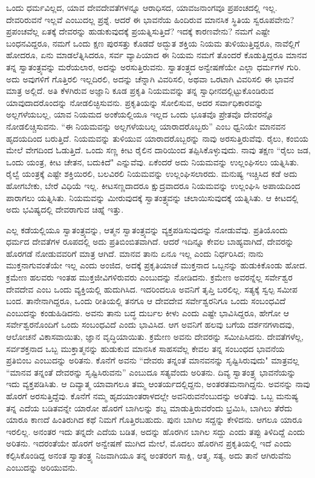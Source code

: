 ಒಂದು ಧರ್ಮವಿಲ್ಲದ, ಯಾವ ದೇವದೇವತೆಗಳನ್ನೂ ಆರಾಧಿಸದ, ಯಾವ\break ಜನಾಂಗವೂ ಪ್ರಪಂಚದಲ್ಲಿ ಇಲ್ಲ. ದೇವರಿರುವನೆ ಇಲ್ಲವೆ ಎಂಬುದಲ್ಲ ಪ್ರಶ್ನೆ. ಆದರೆ ಈ ಭಾವನೆಯ ಹಿಂದಿರುವ ಮಾನಸಿಕ ಸ್ಥಿತಿಯ ಸ್ವರೂಪವೇನು? ಪ್ರಪಂಚವೆಲ್ಲ ಏತಕ್ಕೆ ದೇವರನ್ನು ಹುಡುಕುವುದಕ್ಕೆ ಪ್ರಯತ್ನಿಸುತ್ತಿದೆ? ಇದಕ್ಕೆ ಕಾರಣವೇನು? ನಮಗೆ ಎಷ್ಟೇ ಬಂಧನವಿದ್ದರೂ, ನಮಗೆ ಒಂದು ಕ್ಷಣ ಪುರಸತ್ತು ಕೊಡದೆ ಅದ್ಭುತ ಶಕ್ತಿಯ ನಿಯಮ ತುಳಿಯುತ್ತಿದ್ದರೂ, ನಾವೆಲ್ಲಿಗೆ ಹೋದರೂ, ಏನು ಮಾಡಲೆತ್ನಿಸಿದರೂ, ಸರ್ವ ವ್ಯಾಪಿಯಾದ ಈ ನಿಯಮ ನಮಗೆ ತೊಂದರೆ ಕೊಡುತ್ತಿದ್ದರೂ ಮಾನವ ತನ್ನ ಸ್ವಾತಂತ್ರ್ಯವನ್ನು ಮರೆಯಲಾರ, ಅದನ್ನು ಅರಸುತ್ತಿರುವನು. ಸ್ವಾತಂತ್ರ್ಯದ ಅನ್ವೇಷಣೆಯೇ ಎಲ್ಲಾ ಧರ್ಮಗಳ ಗುರಿ. ಅದು ಅವುಗಳಿಗೆ ಗೊತ್ತಿರಲಿ ಇಲ್ಲದಿರಲಿ, ಅದನ್ನು ಚೆನ್ನಾಗಿ ವಿವರಿಸಲಿ, ಅಥವಾ ಒರಟಾಗಿ ವಿವರಿಸಲಿ ಈ ಭಾವನೆ ಮಾತ್ರ ಅಲ್ಲಿದೆ. ಅತಿ ಕೆಳಗಿರುವ ಅಜ್ಞಾನಿ ಕೂಡ ಪ್ರಕೃತಿ ನಿಯಮವನ್ನು ತನ್ನ ಸ್ವಾಧೀನದಲ್ಲಿಟ್ಟುಕೊಂಡಿರುವ ಯಾವುದಾದರೊಂದನ್ನು ನೋಡಲಿಚ್ಛಿಸುವನು. ಪ್ರಕೃತಿಯನ್ನು ಸೋಲಿಸುವ, ಅದರ ಸರ್ವಾಧಿಕಾರವನ್ನು ಅಲ್ಲಗಳೆಯಬಲ್ಲ, ಯಾವ ನಿಯಮದ ಅಂಕೆಯಲ್ಲಿಯೂ ಇಲ್ಲದ ಒಂದು ಭೂತವೊ ಪ್ರೇತವೊ ದೇವರನ್ನೊ ನೋಡಲಿಚ್ಚಿಸುವನು. “ಈ ನಿಯಮವನ್ನು ಅಲ್ಲಗಳೆಯಬಲ್ಲ ಯಾರಾದರೊಬ್ಬರು” ಎಂಬ ಧ್ವನಿಯೇ ಮಾನವನ ಹೃದಯದಿಂದ ಬರುತ್ತಿದೆ. ನಿಯಮವನ್ನು ತುಳಿಯುವ ಯಾರಾದರೊಬ್ಬರನ್ನು ನಾವು ಅರಸುತ್ತಿರುವೆವು. ರೈಲು, ಕಂಬಿಯ ಮೇಲೆ ವೇಗದಿಂದ ಓಡುತ್ತಿದೆ. ಒಂದು ಸಣ್ಣ ಕೀಟ ರೈಲಿನ ದಾರಿಯಿಂದ ತಪ್ಪಿಸಿಕೊಳ್ಳುವುದು. ನಾವು ತಕ್ಷಣ “ರೈಲು ಜಡ, ಒಂದು ಯಂತ್ರ, ಕೀಟ ಚೇತನ, ಬದುಕಿದೆ" ಎನ್ನುವೆವು. ಏಕೆಂದರೆ ಅದು ನಿಯಮವನ್ನು ಉಲ್ಲಂಘಿಸಲು ಯತ್ನಿಸಿತು. ರೈಲ್ವೆ ಯಂತ್ರಕ್ಕೆ ಎಷ್ಟೇ ಶಕ್ತಿಯಿರಲಿ, ಬಲವಿರಲಿ ನಿಯಮವನ್ನು ಉಲ್ಲಂಘಿಸಲಾರದು. ಮನುಷ್ಯ ಇಚ್ಚಿಸಿದ ಕಡೆ ಅದು ಹೋಗಬೇಕು, ಬೇರೆ ವಿಧಿಯೆ ಇಲ್ಲ. ಕೀಟಸಣ್ಣದಾದರೂ ಕ್ಷುದ್ರವಾದರೂ ನಿಯಮವನ್ನು ಉಲ್ಲಂಘಿಸಿ ಅಪಾಯದಿಂದ ಪಾರಾಗಲು ಯತ್ನಿಸಿತು. ನಿಯಮವನ್ನು ಮೀರುವುದಕ್ಕೆ ಸ್ವಾತಂತ್ರ್ಯವನ್ನು ಚಲಾಯಿಸುವುದಕ್ಕೆ ಯತ್ನಿಸಿತು. ಆ ಕೀಟದಲ್ಲಿ ಅದು ಭವಿಷ್ಯದಲ್ಲಿ ದೇವರಾಗುವ ಚಿಹ್ನೆ ಇತ್ತು.

ಎಲ್ಲ ಕಡೆಯಲ್ಲಿಯೂ ಸ್ವಾತಂತ್ರ್ಯವನ್ನು, ಆತ್ಮನ ಸ್ವಾತಂತ್ರ್ಯವನ್ನು ವ್ಯಕ್ತಪಡಿಸುವುದನ್ನು ನೋಡುವೆವು. ಪ್ರತಿಯೊಂದು ಧರ್ಮದ ದೇವತೆಗಳ ರೂಪದಲ್ಲಿ ಅದು ಪ್ರತಿಬಿಂಬಿತವಾಗಿದೆ. ಆದರೆ ಇದಿನ್ನೂ ಕೇವಲ ಬಾಹ್ಯವಾಗಿದೆ, ದೇವರನ್ನು ಹೊರಗಡೆ ನೋಡುವವರಿಗೆ ಮಾತ್ರ ಆಗಿದೆ. ಮಾನವ ತಾನು ಏನೂ ಇಲ್ಲ ಎಂದು ನಿರ್ಧರಿಸಿದ; ನಾನು ಮುಕ್ತನಾಗುವಂತೆಯೇ ಇಲ್ಲ ಎಂದು ಅಂಜಿದ, ಅದಕ್ಕೆ ಪ್ರಕೃತಿಯಾಚೆ ಮುಕ್ತನಾದ ಒಬ್ಬನನ್ನು ಹುಡುಕಿಕೊಂಡು ಹೋದ. ಕ್ರಮೇಣ ಹಲವರು ಇಂತಹ ಮುಕ್ತಜೀವಿಗಳಿರುವರು ಎಂಬುದನ್ನು ನೋಡಿದನು. ಕ್ರಮೇಣ ಅವರನ್ನೆಲ್ಲ ಸರ್ವೇಶ್ವರ ದೇವದೇವ ಎಂಬ ಒಂದು ವ್ಯಕ್ತಿಯಲ್ಲಿ ಹುದುಗಿಸಿದ. ಇದರಿಂದಲೂ ಅವನಿಗೆ ತೃಪ್ತಿ ಬರಲಿಲ್ಲ. ಸತ್ಯಕ್ಕೆ ಸ್ವಲ್ಪ ಸಮೀಪ ಬಂದ. ತಾನೇನಾಗಿದ್ದರೂ, ಒಂದು ರೀತಿಯಲ್ಲಿ ತನಗೂ ಆ ದೇವದೇವ ಸರ್ವೇಶ್ವರನಿಗೂ ಒಂದು ಸಂಬಂಧವಿದೆ ಎಂಬುದನ್ನು ಕಂಡುಹಿಡಿದನು. ಅವನು ತಾನು ಬದ್ಧ ದುರ್ಬಲ ಕೀಳು ಎಂದು ಎಷ್ಟೇ ಭಾವಿಸಿದ್ದರೂ, ಹೇಗೋ ಆ ಸರ್ವೇಶ್ವರನೊಂದಿಗೆ ಒಂದು ಸಂಬಂಧವಿದೆ ಎಂದು ಭಾವಿಸಿದ. ಆಗ ಅವನಿಗೆ ಹಲವು ಬಗೆಯ ದರ್ಶನಗಳಾದವು, ಆಲೋಚನೆ ವಿಕಾಸವಾಯಿತು, ಜ್ಞಾನ ವೃದ್ಧಿಯಾಯಿತು. ಕ್ರಮೇಣ ಅವನು ದೇವರನ್ನು ಸಮೀಪಿಸಿದನು. ದೇವತೆಗಳೆಲ್ಲ, ಸರ್ವಶಕ್ತನಾದ ಒಬ್ಬ ಮುಕ್ತಾತ್ಮನನ್ನು ಹುಡುಕುವ ಮಾನಸಿಕ ಸಾಹಸವೆಲ್ಲ ಕೇವಲ ತನ್ನ ಸಂಬಂಧದ ಭಾವನೆಯ ಪ್ರತಿಬಿಂಬ ಎಂಬುದನ್ನು ಅರಿತನು. ಕೊನೆಗೆ ಅವನು “ದೇವರು ತನ್ನಂತೆ ಮಾನವನನ್ನು ಸೃಷ್ಟಿಸಿರುವುದು" ಮಾತ್ರವಲ್ಲ “ಮಾನವ ತನ್ನಂತೆ ದೇವರನ್ನು ಸೃಷ್ಟಿಸಿರುವನು” ಎಂಬುದೂ ಸತ್ಯವೆಂದು ಅರಿತನು. ದಿವ್ಯ ಸ್ವಾತಂತ್ರ್ಯ ಭಾವನೆಯನ್ನು ಇದು ವ್ಯಕ್ತಪಡಿಸಿತು. ಆ ದಿವ್ಯಾತ್ಮ ಯಾವಾಗಲೂ ತಮ್ಮ ಆಂತರ್ಯದಲ್ಲಿದ್ದನು, ಅಂತರತಮನಾಗಿದ್ದನು. ಅವನನ್ನು ನಾವು ಹೊರಗೆ ಅರಸುತ್ತಿದ್ದೆವು. ಕೊನೆಗೆ ನಮ್ಮ ಹೃದಯಾಂತರಾಳದಲ್ಲೇ ಅವನಿರುವನೆಂಬುದನ್ನು ಅರಿತೆವು. ಒಬ್ಬ ಮನುಷ್ಯ ತನ್ನ ಎದೆಯ ಬಡಿತವನ್ನೇ ಯಾರೋ ಹೊರಗೆ ಬಾಗಿಲನ್ನು ಶಬ್ದ ಮಾಡುತ್ತಿರುವರೆಂದು ಭ್ರಮಿಸಿ, ಬಾಗಿಲು ತೆರೆದು ಯಾರೂ ಕಾಣದೆ ಹಿಂತಿರುಗಿದ ಕಥೆ ನಿಮಗೆ ಗೊತ್ತಿರಬಹುದು. ಪುನಃ ಬಾಗಿಲ ಸದ್ದನ್ನು ಕೇಳಿದನು. ಆಗಲೂ ಯಾರೂ ಇರಲಿಲ್ಲ. ಅನಂತರ ಇದು ತನ್ನದೇ ಎದೆಯ ಬಡಿತ, ಅದನ್ನು ಹೊರಗಿನ ಬಾಗಿಲ ಸದ್ದು ಎಂದು ತಪ್ಪು ತಿಳಿದಿದ್ದೆ ಎಂದು ಅರಿತನು. ಇದರಂತೆಯೇ ಹೊರಗೆ ಅನ್ವೇಷಣೆ ಮುಗಿದ ಮೇಲೆ, ಮೊದಲು ಹೊರಗಿನ ಪ್ರಕೃತಿಯಲ್ಲಿ ಇದೆ ಎಂದು ಕಲ್ಪಿಸಿಕೊಂಡಿದ್ದ ಅನಂತ ಸ್ವಾತಂತ್ರ್ಯ ನಿಜವಾಗಿಯೂ ತನ್ನ ಅಂತರಂಗ ಸಾಕ್ಷಿ, ಆತ್ಮ, ಸತ್ಯ, ಅದು ತಾನೆ ಆಗಿರುವೆನು ಎಂಬುದನ್ನು ಅರಿಯುವನು.

